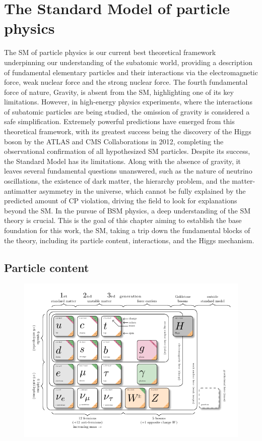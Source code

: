 \chapter{The Standard Model of particle physics}

The \ac{SM} of particle physics is our current best theoretical framework underpinning our understanding of the subatomic world, providing a description of fundamental elementary particles and their interactions via the electromagnetic force, weak nuclear force and the strong nuclear force. The fourth fundamental force of nature, Gravity, is absent from the SM, highlighting one of its key limitations. However, in high-energy physics experiments, where the interactions of subatomic particles are being studied, the omission of gravity is considered a safe simplification. Extremely powerful predictions have emerged from this theoretical framework, with its greatest success being the discovery of the Higgs boson by the ATLAS and CMS Collaborations in 2012, completing the observational confirmation of all hypothesized SM particles. Despite its success, the Standard Model has its limitations. Along with the absence of gravity, it leaves several fundamental questions unanswered, such as the nature of neutrino oscillations, the existence of dark matter, the hierarchy problem, and the matter-antimatter asymmetry in the universe, which cannot be fully explained by the predicted amount of CP violation, driving the field to look for explanations beyond the SM. In the pursue of \ac{BSM} physics, a deep understanding of the SM theory is crucial. This is the goal of this chapter aiming to establish the base foundation for this work, the SM, taking a trip down the fundamental blocks of the theory, including its particle content, interactions, and the Higgs mechanism.

\section{Particle content}

\begin{figure}
\centering
\includegraphics[width= 1\textwidth]{Figures/Introduction/Particles.pdf}
\end{figure}

